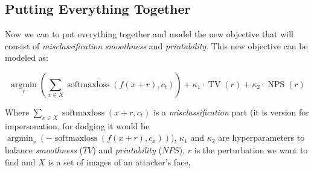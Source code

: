 \subsection{Putting Everything Together}

Now we can to put everything together and model the new objective that will consist of \textit{misclassification} \textit{smoothness} and \textit{printability}. This new objective can be modeled as: 

\begin{equation}
\underset{r}{\operatorname{argmin}}\left(\sum_{x \in X} \operatorname{softmaxloss}\left(f(x+r), c_{t}\right)\right)+\kappa_{1} \cdot \operatorname{TV}(r)+\kappa_{2} \cdot \operatorname{NPS}(r)
\end{equation}

Where $\sum_{x \in X} \operatorname{softmaxloss}\left(x+r, c_{t}\right)$ is a \textit{misclassification} part (it is version for impersonation, for dodging it would be $\operatorname{argmin}_{r}\left(-\operatorname{softmaxloss}\left(f(x+r), c_{x}\right)\right)$), $\kappa_1$ and $\kappa_2$ are hyperparameters to balance \textit{smoothness} ($TV$) and \textit{printability} ($NPS$), $r$ is the perturbation we want to find and $X$ is a set of images of an attacker's face, 